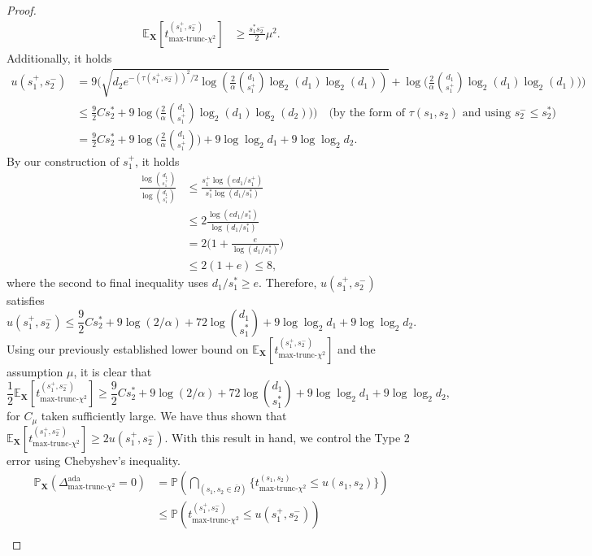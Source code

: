 \documentclass{article}
\newcommand{\X}{\mathbf{X}}
\newcommand{\EE}{\mathbb{E}}
\newcommand{\pr}{\mathbb{P}}
\newcommand{\chisqmax}{\text{max-trunc-$\chi^2$}}
\theoremstyle{remark}
\begin{document}
\begin{proof}
\begin{align*}
    \EE_{\mathbf{X}}[t^{(s_1^+, s_2^-)}_{\chisqmax}] &\geq \frac{s_1^*s_2^-}{2}\mu^2.
\end{align*}
Additionally, it holds
\begin{align*}
    u(s^+_1, s^-_2) &= 9\Big(\sqrt{d_2e^{-(\tau(s^+_1, s^-_2))^2/2}\log(\frac{2}{\alpha}{d_1\choose s^+_1}\log_2(d_1)\log_2(d_1))} + \log\Big(\frac{2}{\alpha}{d_1 \choose s^+_1}\log_2(d_1)\log_2(d_1)\Big)\Big) \\
    &\leq \frac92Cs^*_2 + 9\log\Big(\frac{2}{\alpha}{d_1 \choose s^+_1}\log_2(d_1)\log_2(d_2)\Big)\Big) \quad \text{(by the form of $\tau(s_1, s_2)$ and using $s_2^- \leq s_2^*$)} \\
    &= \frac92Cs^*_2 + 9\log\Big(\frac{2}{\alpha}{d_1 \choose s^+_1}\Big) + 9 \log \log_2 d_1 + 9 \log \log_2 d_2.
\end{align*}
By our construction of $s_1^+$, it holds
\begin{align*}
    \frac{\log {d_1 \choose s^+_1}}{\log {d_1 \choose s^*_1}} &\leq \frac{s_1^+\log(ed_1 / s_1^+)}{s_1^*\log(d_1 / s_1^*)} \\
    &\leq 2\frac{\log(ed_1/s_1^*)}{\log(d_1 / s_1^*)} \\
    &= 2\Big(1 + \frac{e}{\log(d_1/s_1^*)}\Big) \\
    &\leq 2(1 + e) \leq 8,
\end{align*}
where the second to final inequality uses $d_1 / s_1^* \geq e$. Therefore, $u(s_1^+, s_2^-)$ satisfies
\[u(s_1^+, s_2^-) \leq \frac{9}{2}Cs_2^* + 9\log(2/\alpha) + 72\log {d_1 \choose s_1^*} + 9\log \log_2 d_1 + 9 \log \log_2 d_2.\]
Using our previously established lower bound on $\EE_{\mathbf{X}}[t^{(s_1^+, s_2^-)}_{\chisqmax}]$ and the assumption $\mu$, it is clear that
\[\frac12\EE_{\mathbf{X}}[t^{(s_1^+, s_2^-)}_{\chisqmax}] \geq \frac{9}{2}Cs_2^* + 9\log(2/\alpha) + 72\log {d_1 \choose s_1^*} + 9\log \log_2 d_1 + 9 \log \log_2 d_2,\]
for $C_\mu$ taken sufficiently large. We have thus shown that $\EE_{\mathbf{X}}[t^{(s_1^+, s_2^-)}_{\chisqmax}] \geq 2 u(s_1^{+}, s_2^{-})$. With this result in hand, we control the Type 2 error using Chebyshev's inequality.
\begin{align*}
    \pr_\X \left(\Delta^{\text{ada}}_{\chisqmax} = 0\right) &= \pr\left(\bigcap_{(s_1, s_2 \in \bar{\Omega})} \bigg\{t_{\chisqmax}^{(s_1, s_2)} \leq u(s_1, s_2) \bigg\}\right) \\
    &\leq \pr\left(t_{\chisqmax}^{(s^+_1, s^-_2)} \leq u(s^+_1, s^-_2)\right) \\

\end{align*}
\end{proof}
\end{document}
